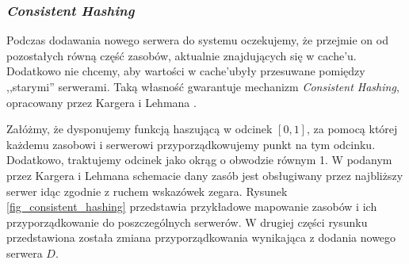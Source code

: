 \documentclass[a4paper,11pt]{scrartcl}
\newcommand{\keszu}{cache'u}
\begin{document}
\subsubsection{\textit{Consistent Hashing}}
\label{sect_consistent_hashing}
Podczas dodawania nowego serwera do systemu oczekujemy, że przejmie on od pozostałych równą część zasobów, aktualnie znajdujących się w \keszu. Dodatkowo nie chcemy, aby wartości w \keszu były przesuwane pomiędzy ,,starymi'' serwerami. Taką własność gwarantuje mechanizm \textit{Consistent Hashing}, opracowany przez Kargera i Lehmana \cite{karger1997consistent}.

Załóżmy, że dysponujemy funkcją haszującą w odcinek $[0, 1]$, za pomocą której każdemu zasobowi i serwerowi przyporządkowujemy punkt na tym odcinku. Dodatkowo, traktujemy odcinek jako okrąg o obwodzie równym 1. W podanym przez Kargera i Lehmana schemacie dany zasób jest obsługiwany przez najbliższy serwer idąc zgodnie z ruchem wskazówek zegara. Rysunek \ref{fig_consistent_hashing} przedstawia przykładowe mapowanie zasobów i ich przyporządkowanie do poszczególnych serwerów. W drugiej części rysunku przedstawiona została zmiana przyporządkowania wynikająca z dodania nowego serwera $D$.
\end{document}
